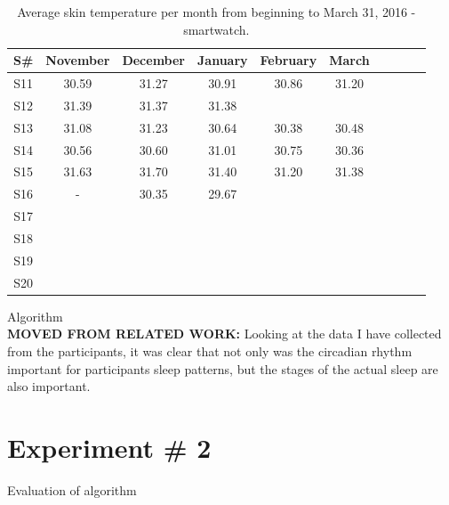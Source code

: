 \documentclass[12pt]{article} %
\begin{document}
\begin{table}[H]
\center
\begin{footnotesize}
	\begin{tabular}{| c | c | c | c | c | c | c | c | c | c |}
	\hline
	\textbf{S\#} & \textbf{November} & \textbf{December} & \textbf{January} & \textbf{February} & \textbf{March} \\
	
	\hline
	S11 & 30.59 & 31.27 & 30.91 & 30.86 & 31.20\\
	\hline
	S12 & 31.39 & 31.37 & 31.38 &  & \\
	\hline
	S13 & 31.08 & 31.23 & 30.64 & 30.38 & 30.48\\
	\hline
	S14 & 30.56 & 30.60 & 31.01 & 30.75 & 30.36\\
	\hline
	S15 & 31.63 & 31.70 & 31.40 & 31.20 & 31.38\\
	\hline
	S16 & - & 30.35 & 29.67 &  & \\
	\hline
	S17 &  &  &  &  & \\
	\hline
	S18 &  &  &  &  & \\
	\hline
	S19 &  &  &  &  & \\
	\hline
	S20 &  &  &  &  & \\
	\hline
	\end{tabular}
	\caption{Average skin temperature per month from beginning to March 31, 2016 - smartwatch.}
	\label{tab:totalMinutesWatch}
\end{footnotesize}
\end{table}




Algorithm\\

\textbf{MOVED FROM RELATED WORK:}
Looking at the data I have collected from the participants, it was clear that not only was the circadian rhythm important for participants sleep patterns, but the stages of the actual sleep are also important. 





\section{Experiment \# 2}
Evaluation of algorithm 

\end{document}
